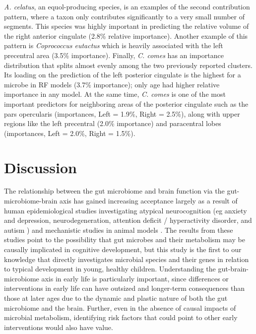 \documentclass{article}
\begin{document}
\emph{A. celatus}, an equol-producing species, is an examples of the second contribution
pattern, where a taxon only contributes significantly to a very small number of segments. 
This species was highly important in predicting the relative volume of
the right anterior cingulate (2.8\% relative importance).
Another example of this pattern is \emph{Coprococcus eutactus}
which is heavily associated with the left precentral area (3.5\% importance). 
Finally, \emph{C. comes} has an importance
distribution that splits almost evenly among the two previously reported
clusters. Its loading on the prediction of the left posterior cingulate
is the highest for a microbe in RF models (3.7\% importance);
only age had higher relative importance in any model. At the same time,
\textit{C. comes} is one of the most important predictors for neighboring areas of the
posterior cingulate such as the pars opercularis (importances,
Left = 1.9\%, Right = 2.5\%), along with upper regions like the left
precentral (2.0\% importance) and paracentral lobes (importances, Left = 2.0\%, Right = 1.5\%).

\section*{Discussion}

The relationship between the gut microbiome and brain function via the
gut-microbiome-brain axis has gained increasing acceptance largely as a
result of human epidemiological studies investigating atypical
neurocognition (eg anxiety and depression, neurodegeneration, attention
deficit / hyperactivity disorder, and autism \cite{romanGutBrainAxis2018,fosterGutBrainAxis2013})
and mechanistic studies in animal models
\cite{hsiaoMicrobiotaModulateBehavioral2013,needhamGutderivedMetaboliteAlters2022}.
The results from these studies point to the possibility
that gut microbes and their metabolism may be causally implicated in
cognitive development, but this study is the first to our knowledge that
directly investigates microbial species and their genes in relation to
typical development in young, healthy children. Understanding the gut-brain-microbiome axis
in early life is particularly important, since differences or
interventions in early life can have outsized and longer-term
consequences than those at later ages
due to the dynamic and plastic nature of both the gut microbiome and the brain.
Further, even in the absence of
causal impacts of microbial metabolism, identifying risk factors that
could point to other early interventions would also have value.
\end{document}
